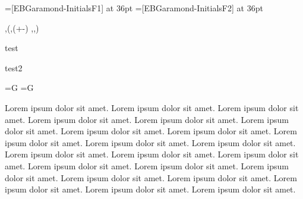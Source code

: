 
\fontfam[Libertinus]

\font\ebgbg=[EBGaramond-InitialsF1] at 36pt
\font\ebgfg=[EBGaramond-InitialsF2] at 36pt


\grid \hsize,\baselineskip(\hoffset,\dimexpr(\voffset+\topskip-\baselineskip) ,\hsize ,\vsize)

\def\dropcapcolorfg{\Black}

\def\dropcapL#1#2#3{%
\parindent0pt
\setbox1=\hbox{\typosize[20/]#1\kern2pt}
\setbox2=\hbox{\dropcapcolorfg\typosize[45/]#2\kern4pt}
\setbox3=\hbox{\setff{+smcp}\setletterspace{15}\currvar #3}
\dimen1=\dimexpr\wd2+0pt
\dimen2=\dimexpr\wd2+0pt
\dimen3=\dimexpr\wd2+0pt
\line{}
\leavevmode
\kern0pt
\smash{%
    \llap{%
        \vbox to \ht2{%
            \box1%
            \vfil%
        }%
    }%
    \box2%
}%
\par
\vskip-2.3\baselineskip
\leavevmode
\parshape 4
    \dimen1 \dimexpr\hsize-\dimen1
    \dimen2 \dimexpr\hsize-\dimen2      
    \dimen3 \dimexpr\hsize-\dimen3  
    0pc \hsize
\box3\ %
}






test\par
{}\baselineskip
test2\par
{}=\hbox{\Red \ebgfg G}
=\hbox{\ebgbg G}
\baselineskip
\noindent{}\par
Lorem ipsum dolor sit amet. Lorem ipsum dolor sit amet. Lorem ipsum dolor sit amet. Lorem ipsum dolor sit amet. Lorem ipsum dolor sit amet. Lorem ipsum dolor sit amet. Lorem ipsum dolor sit amet. Lorem ipsum dolor sit amet. Lorem ipsum dolor sit amet. Lorem ipsum dolor sit amet. Lorem ipsum dolor sit amet. Lorem ipsum dolor sit amet. Lorem ipsum dolor sit amet. Lorem ipsum dolor sit amet. Lorem ipsum dolor sit amet. Lorem ipsum dolor sit amet. Lorem ipsum dolor sit amet. Lorem ipsum dolor sit amet. Lorem ipsum dolor sit amet. Lorem ipsum dolor sit amet. Lorem ipsum dolor sit amet. Lorem ipsum dolor sit amet. 


\bye
